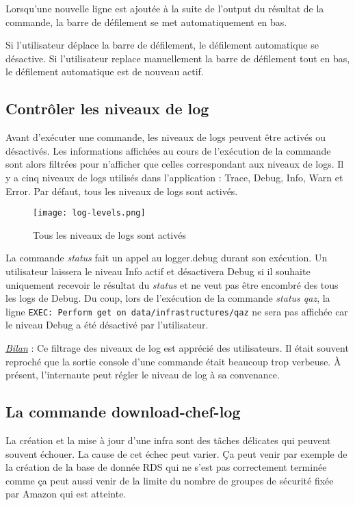 Lorsqu'une nouvelle ligne est ajoutée à la suite de l'output du résultat de la
commande, la barre de défilement se met automatiquement en bas.

Si l'utilisateur déplace la barre de défilement, le défilement automatique se
désactive.
Si l'utilisateur replace manuellement la barre de défilement tout en bas,
le défilement automatique est de nouveau actif.

\subsection{Contrôler les niveaux de log}

Avant d'exécuter une commande, les niveaux de logs peuvent être activés ou
désactivés. Les informations affichées au cours de l'exécution de la commande
sont alors filtrées pour n'afficher que celles correspondant aux niveaux de logs.
Il y a cinq niveaux de logs utilisés dans l'application : 
Trace, Debug, Info, Warn et Error.
Par défaut, tous les niveaux de logs sont activés.

\begin{figure}[H]
  \texttt{[image: log-levels.png]}
  \caption{Tous les niveaux de logs sont activés}
\end{figure}

\bigskip

La commande \textit{status} fait un appel au logger.debug durant son exécution.
Un utilisateur laissera le niveau Info actif et désactivera Debug
si il souhaite uniquement recevoir le résultat du \textit{status} et ne veut pas
être encombré des tous les logs de Debug.
Du coup, lors de l'exécution de la commande \textit{status qaz}, la ligne
\verb?EXEC: Perform get on data/infrastructures/qaz? ne sera pas affichée car le
niveau Debug a été désactivé par l'utilisateur.

\underline{\textit{Bilan}} : Ce filtrage des niveaux de log est apprécié des
utilisateurs. Il était souvent reproché que la sortie console d'une commande
était beaucoup trop verbeuse. À présent, l'internaute peut régler le niveau de
log à sa convenance.

\subsection{La commande download-chef-log}
La création et la mise à jour d'une infra sont des tâches délicates qui peuvent
souvent échouer.
La cause de cet échec peut varier.
Ça peut venir par exemple de la création de la base de donnée RDS qui ne s'est
pas correctement terminée comme ça peut aussi venir de la limite du nombre de
groupes de sécurité fixée par Amazon qui est atteinte.

